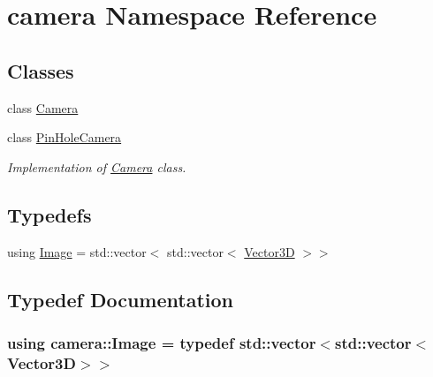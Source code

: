 \hypertarget{namespacecamera}{}\section{camera Namespace Reference}
\label{namespacecamera}
\subsection*{Classes}
\begin{DoxyCompactItemize}
\item 
class \hyperlink{classcamera_1_1Camera}{Camera}
\item 
class \hyperlink{classcamera_1_1PinHoleCamera}{Pin\+Hole\+Camera}
\begin{DoxyCompactList}\small\item\em Implementation of \hyperlink{classcamera_1_1Camera}{Camera} class. \end{DoxyCompactList}\end{DoxyCompactItemize}
\subsection*{Typedefs}
\begin{DoxyCompactItemize}
\item 
using \hyperlink{namespacecamera_a67b7fb3d5582463a057ed122bf739b7d}{Image} = std\+::vector$<$ std\+::vector$<$ \hyperlink{classVector3D}{Vector3D} $>$$>$
\end{DoxyCompactItemize}


\subsection{Typedef Documentation}
\subsubsection[{\texorpdfstring{Image}{Image}}]{\setlength{\rightskip}{0pt plus 5cm}using {\bf camera\+::\+Image} = typedef std\+::vector$<$std\+::vector$<${\bf Vector3D}$>$$>$}\hypertarget{namespacecamera_a67b7fb3d5582463a057ed122bf739b7d}{}\label{namespacecamera_a67b7fb3d5582463a057ed122bf739b7d}
